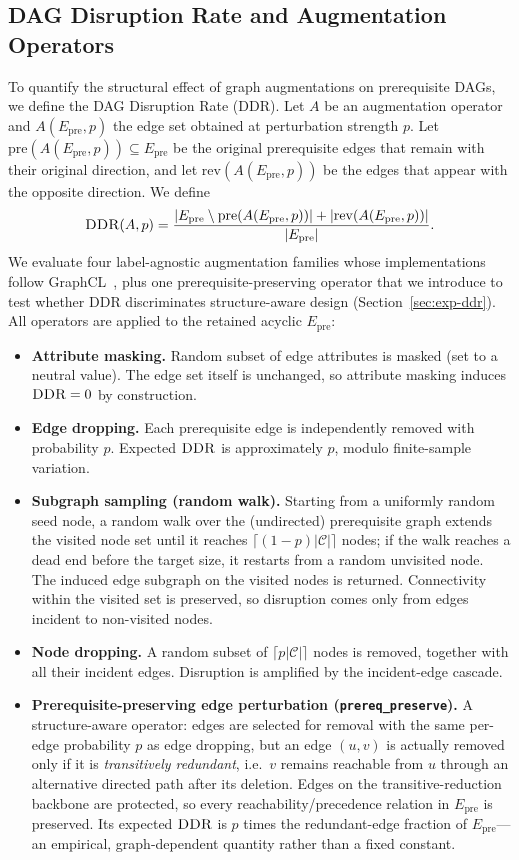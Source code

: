 \documentclass[pdflatex,sn-basic]{sn-jnl}
\newcommand{\Epre}{\ensuremath{E_{\text{pre}}}}
\newcommand{\DDR}{\textsc{DDR}}
\begin{document}
\subsection{DAG Disruption Rate and Augmentation Operators}
\label{sec:ddr}
To quantify the structural effect of graph augmentations on prerequisite
DAGs, we define the DAG Disruption Rate (\DDR{}). Let $A$ be an
augmentation operator and $A(\Epre,p)$ the edge set obtained at
perturbation strength $p$. Let $\mathrm{pre}(A(\Epre,p))\subseteq\Epre$
be the original prerequisite edges that remain with their original
direction, and let $\mathrm{rev}(A(\Epre,p))$ be the edges that appear
with the opposite direction. We define
\begin{equation}
\DDR(A,p)=
\frac{|\Epre\setminus \mathrm{pre}(A(\Epre,p))|
      +|\mathrm{rev}(A(\Epre,p))|}
     {|\Epre|}.
\label{eq:ddr}
\end{equation}
We evaluate four label-agnostic augmentation families whose
implementations follow GraphCL~\cite{you2020graphcl}, plus one
prerequisite-preserving operator that we introduce to test whether
\DDR{} discriminates structure-aware design (Section~\ref{sec:exp-ddr}).
All operators are applied to the retained acyclic $\Epre$:
\begin{itemize}
  \item \textbf{Attribute masking.} Random subset of edge attributes
  is masked (set to a neutral value). The edge set itself is
  unchanged, so attribute masking induces $\DDR=0$ by construction.
  \item \textbf{Edge dropping.} Each prerequisite edge is independently
  removed with probability $p$. Expected $\DDR$ is approximately $p$,
  modulo finite-sample variation.
  \item \textbf{Subgraph sampling (random walk).} Starting from a
  uniformly random seed node, a random walk over the (undirected)
  prerequisite graph extends the visited node set until it reaches
  $\lceil(1-p)|\mathcal{C}|\rceil$ nodes; if the walk reaches a dead
  end before the target size, it restarts from a random unvisited
  node. The induced edge subgraph on the visited nodes is returned.
  Connectivity within the visited set is preserved, so disruption
  comes only from edges incident to non-visited nodes.
  \item \textbf{Node dropping.} A random subset of $\lceil p|\mathcal{C}|\rceil$
  nodes is removed, together with all their incident edges. Disruption
  is amplified by the incident-edge cascade.
  \item \textbf{Prerequisite-preserving edge perturbation
  (\texttt{prereq\_preserve}).} A structure-aware operator: edges are
  selected for removal with the same per-edge probability $p$ as edge
  dropping, but an edge $(u,v)$ is actually removed only if it is
  \emph{transitively redundant}, i.e.\ $v$ remains reachable from $u$
  through an alternative directed path after its deletion. Edges on the
  transitive-reduction backbone are protected, so every
  reachability/precedence relation in $\Epre$ is preserved. Its expected
  $\DDR$ is $p$ times the redundant-edge fraction of $\Epre$---an
  empirical, graph-dependent quantity rather than a fixed constant.
\end{itemize}
\end{document}
